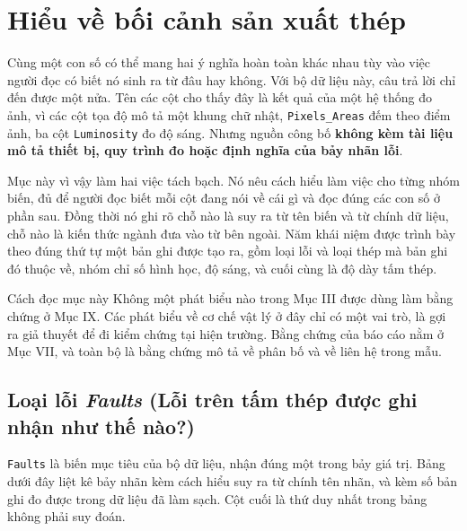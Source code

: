 \documentclass[12pt]{article}
\begin{document}
\clearpage
\section{Hiểu về bối cảnh sản xuất thép}

Cùng một con số có thể mang hai ý nghĩa hoàn toàn khác nhau tùy vào việc người đọc có biết nó sinh ra từ đâu hay không. Với bộ dữ liệu này, câu trả lời chỉ đến được một nửa. Tên các cột cho thấy đây là kết quả của một hệ thống đo ảnh, vì các cột tọa độ mô tả một khung chữ nhật, \texttt{Pixels\_Areas} đếm theo điểm ảnh, ba cột \texttt{Luminosity} đo độ sáng. Nhưng nguồn công bố \textbf{không kèm tài liệu mô tả thiết bị, quy trình đo hoặc định nghĩa của bảy nhãn lỗi}.

\noindent Mục này vì vậy làm hai việc tách bạch. Nó nêu cách hiểu làm việc cho từng nhóm biến, đủ để người đọc biết mỗi cột đang nói về cái gì và đọc đúng các con số ở phần sau. Đồng thời nó ghi rõ chỗ nào là suy ra từ tên biến và từ chính dữ liệu, chỗ nào là kiến thức ngành đưa vào từ bên ngoài. Năm khái niệm được trình bày theo đúng thứ tự một bản ghi được tạo ra, gồm loại lỗi và loại thép mà bản ghi đó thuộc về, nhóm chỉ số hình học, độ sáng, và cuối cùng là độ dày tấm thép.

\begin{guidelinebox}{Cách đọc mục này}
Không một phát biểu nào trong Mục III được dùng làm bằng chứng ở Mục IX. Các phát biểu về cơ chế vật lý ở đây chỉ có một vai trò, là gợi ra giả thuyết để đi kiểm chứng tại hiện trường. Bằng chứng của báo cáo nằm ở Mục VII, và toàn bộ là bằng chứng mô tả về phân bố và về liên hệ trong mẫu.
\end{guidelinebox}

\subsection{Loại lỗi \textit{Faults} (Lỗi trên tấm thép được ghi nhận như thế nào?)}

\texttt{Faults} là biến mục tiêu của bộ dữ liệu, nhận đúng một trong bảy giá trị. Bảng dưới đây liệt kê bảy nhãn kèm cách hiểu suy ra từ chính tên nhãn, và kèm số bản ghi đo được trong dữ liệu đã làm sạch. Cột cuối là thứ duy nhất trong bảng không phải suy đoán.
\end{document}
